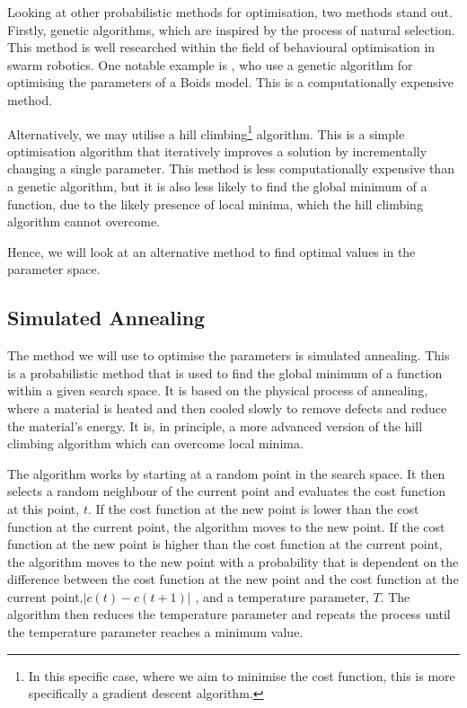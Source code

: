 \documentclass[12pt]{article}
\begin{document}
Looking at other probabilistic methods for optimisation, two methods stand out. Firstly, genetic algorithms, which are inspired by the process of natural selection. This method is well researched within the field of behavioural optimisation in swarm robotics. One notable example is \citet{Alaliyat2014OptimisationOB}, who use a genetic algorithm for optimising the parameters of a Boids model. This is a computationally expensive method.

Alternatively, we may utilise a hill climbing\footnote{In this specific case, where we aim to minimise the cost function, this is more specifically a gradient descent algorithm.} algorithm. This is a simple optimisation algorithm that iteratively improves a solution by incrementally changing a single parameter. This method is less computationally expensive than a genetic algorithm, but it is also less likely to find the global minimum of a function, due to the likely presence of local minima, which the hill climbing algorithm cannot overcome.

Hence, we will look at an alternative method to find optimal values in the parameter space.

\subsection{Simulated Annealing}
The method we will use to optimise the parameters is simulated annealing. This is a probabilistic method that is used to find the global minimum of a function within a given search space. It is based on the physical process of annealing, where a material is heated and then cooled slowly to remove defects and reduce the material's energy. It is, in principle, a more advanced version of the hill climbing algorithm which can overcome local minima.

The algorithm works by starting at a random point in the search space. It then selects a random neighbour of the current point and evaluates the cost function at this point, $t$. If the cost function at the new point is lower than the cost function at the current point, the algorithm moves to the new point. If the cost function at the new point is higher than the cost function at the current point, the algorithm moves to the new point with a probability that is dependent on the difference between the cost function at the new point and the cost function at the current point,$|c(t) - c(t+1)|$ , and a temperature parameter, $T$. The algorithm then reduces the temperature parameter and repeats the process until the temperature parameter reaches a minimum value.
\end{document}
